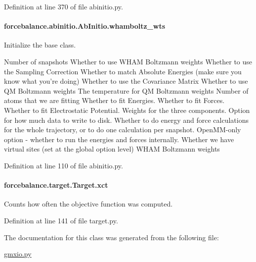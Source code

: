 Definition at line 370 of file abinitio.\-py.

\hypertarget{classforcebalance_1_1abinitio_1_1AbInitio_a885e7ef58b9e7c6abbc24321e5f3c61a}{
\paragraph[{whamboltz\-\_\-wts}]{\setlength{\rightskip}{0pt plus 5cm}forcebalance.\-abinitio.\-Ab\-Initio.\-whamboltz\-\_\-wts\hspace{0.3cm}{\ttfamily [inherited]}}}\label{classforcebalance_1_1abinitio_1_1AbInitio_a885e7ef58b9e7c6abbc24321e5f3c61a}


Initialize the base class. 

Number of snapshots Whether to use W\-H\-A\-M Boltzmann weights Whether to use the Sampling Correction Whether to match Absolute Energies (make sure you know what you're doing) Whether to use the Covariance Matrix Whether to use Q\-M Boltzmann weights The temperature for Q\-M Boltzmann weights Number of atoms that we are fitting Whether to fit Energies. Whether to fit Forces. Whether to fit Electrostatic Potential. Weights for the three components. Option for how much data to write to disk. Whether to do energy and force calculations for the whole trajectory, or to do one calculation per snapshot. Open\-M\-M-\/only option -\/ whether to run the energies and forces internally. Whether we have virtual sites (set at the global option level) W\-H\-A\-M Boltzmann weights 

Definition at line 110 of file abinitio.\-py.

\hypertarget{classforcebalance_1_1target_1_1Target_aad2e385cfbf7b4a68f1c2cb41133fe82}{
\paragraph[{xct}]{\setlength{\rightskip}{0pt plus 5cm}forcebalance.\-target.\-Target.\-xct\hspace{0.3cm}{\ttfamily [inherited]}}}\label{classforcebalance_1_1target_1_1Target_aad2e385cfbf7b4a68f1c2cb41133fe82}


Counts how often the objective function was computed. 



Definition at line 141 of file target.\-py.



The documentation for this class was generated from the following file\-:\begin{DoxyCompactItemize}
\item 
\hyperlink{gmxio_8py}{gmxio.\-py}\end{DoxyCompactItemize}
